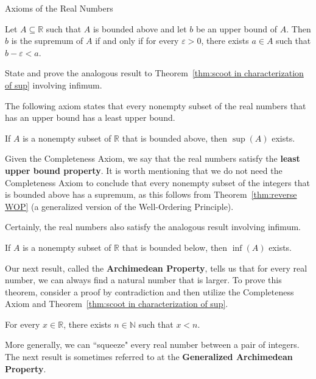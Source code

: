 \begin{section}{Axioms of the Real Numbers}
\begin{theorem}\label{thm:scoot in characterization of sup}
Let $A\subseteq \mathbb{R}$ such that $A$ is bounded above and let $b$ be an upper bound of $A$. Then $b$ is the supremum of $A$ if and only if for every $\varepsilon >0$, there exists $a\in A$ such that $b-\varepsilon <a$.
\end{theorem}

\begin{problem}
State and prove the analogous result to Theorem~\ref{thm:scoot in characterization of sup} involving infimum.
\end{problem}

The following axiom states that every nonempty subset of the real numbers that has an upper bound has a least upper bound.

\begin{axiom}\label{axiom:completeness}
If $A$ is a nonempty subset of $\mathbb{R}$ that is bounded above, then $\sup(A)$ exists.
\end{axiom}

Given the Completeness Axiom, we say that the real numbers satisfy the \textbf{least upper bound property}. It is worth mentioning that we do not need the Completeness Axiom to conclude that every nonempty subset of the integers that is bounded above has a supremum, as this follows from Theorem~\ref{thm:reverse WOP} (a generalized version of the Well-Ordering Principle). 

Certainly, the real numbers also satisfy the analogous result involving infimum.

\begin{theorem}
If $A$ is a nonempty subset of $\mathbb{R}$ that is bounded below, then $\inf(A)$ exists.
\end{theorem}

Our next result, called the \textbf{Archimedean Property}, tells us that for every real number, we can always find a natural number that is larger. To prove this theorem, consider a proof by contradiction and then utilize the Completeness Axiom and Theorem~\ref{thm:scoot in characterization of sup}.

\begin{theorem}
For every $x\in\mathbb{R}$, there exists $n\in\mathbb{N}$ such that $x<n$.
\end{theorem}

More generally, we can ``squeeze" every real number between a pair of integers. The next result is sometimes referred to at the \textbf{Generalized Archimedean Property}.


\end{section}
